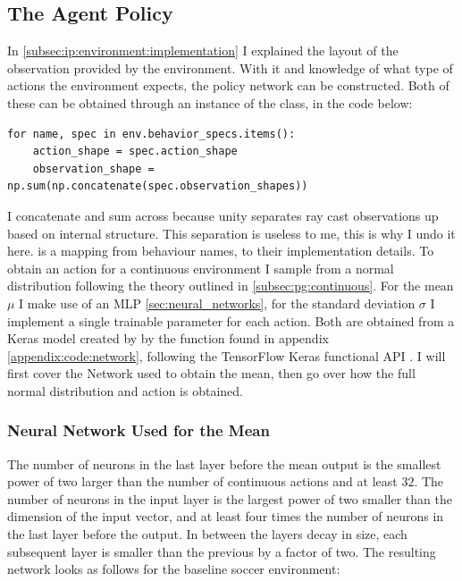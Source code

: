 \subsection{The Agent Policy}\label{subsec:ip:agent:network}
In \ref{subsec:ip:environment:implementation} I explained the layout of the observation provided by the environment. With it and knowledge of what type of actions the environment expects, the policy network can be constructed. Both of these can be obtained through an instance of the  class,  in the code below:

\begin{lstlisting}[basicstyle=\footnotesize]
for name, spec in env.behavior_specs.items():
    action_shape = spec.action_shape
    observation_shape = np.sum(np.concatenate(spec.observation_shapes))
\end{lstlisting}

\noindent
I concatenate and sum across  because unity separates ray cast observations up based on internal structure. This separation is useless to me, this is why I undo it here.  is a mapping from behaviour names, to their implementation details. To obtain an action for a continuous environment I sample from a normal distribution following the theory outlined in \ref{subsec:pg:continuous}. For the mean $\mu$ I make use of an MLP \ref{sec:neural_networks}, for the standard deviation $\sigma$ I implement a single trainable parameter for each action. Both are obtained from a Keras model created by by the function found in appendix \ref{appendix:code:network}, following the TensorFlow Keras functional API \cite{noauthor_tensorflow_nodate}\cite{chollet2015keras}. I will first cover the Network used to obtain the mean, then go over how the full normal distribution and action is obtained.

\subsubsection{Neural Network Used for the Mean}\label{subsubsec:ip:agent:policy:mean}
The number of neurons in the last layer before the mean output is the smallest power of two larger than the number of continuous actions and at least $32$. The number of neurons in the input layer is the largest power of two smaller than the dimension of the input vector, and at least four times the number of neurons in the last layer before the output. In between the layers decay in size, each subsequent layer is smaller than the previous by a factor of two. The resulting network looks as follows for the baseline soccer environment:


